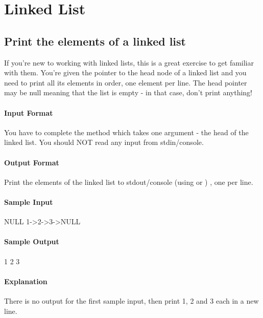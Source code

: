 \chapter{Linked List}


\section{Print the elements of a linked list} %
\label{sec:Print-the-elements-of-a-linked-list}

If you’re new to working with linked lists, this is a great exercise to get familiar with them. You’re given the pointer to the head node of a linked list and you need to print all its elements in order, one element per line. The head pointer may be null meaning that the list is empty - in that case, don’t print anything!


\subsubsection{Input Format}
You have to complete the  method which takes one argument - the head of the linked list. You should NOT read any input from stdin/console.


\subsubsection{Output Format}
Print the elements of the linked list to stdout/console (using  or ) , one per line.


\subsubsection{Sample Input}
\begin{Code}
NULL
1->2->3->NULL
\end{Code}


\subsubsection{Sample Output}
\begin{Code}
1
2
3
\end{Code}


\subsubsection{Explanation}
There is no output for the first sample input, then print 1, 2 and 3 each in a new line.


